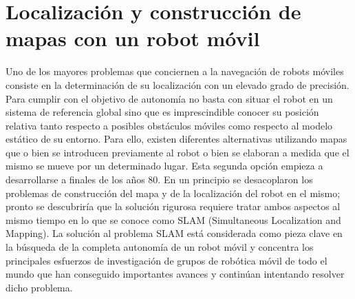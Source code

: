 \section{Localización y construcción de mapas con un robot móvil}
Uno de los mayores problemas que conciernen a la navegación de robots móviles consiste en la determinación de su localización con un elevado grado de precisión. Para cumplir con el objetivo de autonomía no basta con situar el robot en un sistema de referencia global sino que es imprescindible conocer su posición relativa tanto respecto a posibles obstáculos móviles como respecto al modelo estático de su entorno. Para ello, existen diferentes alternativas utilizando mapas que o bien se introducen previamente al robot o bien se elaboran a medida que el mismo se mueve por un determinado lugar. Esta segunda opción empieza a desarrollarse a finales de los años 80. En un principio se desacoplaron los problemas de construcción del mapa y de la localización del robot en el mismo; pronto se descubriría que la solución rigurosa requiere tratar ambos aspectos al mismo tiempo en lo que se conoce como SLAM (Simultaneous Localization and Mapping). La solución al problema SLAM está considerada como pieza clave en la búsqueda de la completa autonomía de un robot móvil y concentra los principales esfuerzos de investigación de grupos de robótica móvil de todo el mundo que han conseguido importantes avances y continúan intentando resolver dicho problema.


